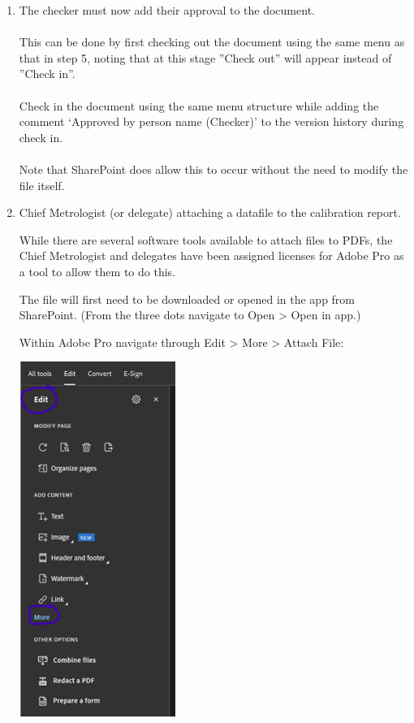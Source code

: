 \begin{enumerate}
\item The checker must now add their approval to the document.
\\
\\This can be done by first checking out the document using the same menu as that in step 5, noting that at this stage ''Check out'' will appear instead of ''Check in''.
\\
\\Check in the document using the same menu structure while adding the comment  ‘Approved by person name (Checker)’ to the version history during check in.
\\
\\Note that SharePoint does allow this to occur without the need to modify the file itself.

\item Chief Metrologist (or delegate) attaching a datafile to the calibration report.

While there are several software tools available to attach files to PDFs, the Chief Metrologist and delegates have been assigned licenses for Adobe Pro as a tool to allow them to do this.

The file will first need to be downloaded or opened in the app from SharePoint.  (From the three dots navigate to Open > Open in app.)

Within Adobe Pro navigate through Edit > More > Attach File:

\begin{center}
\includegraphics[scale=.55]{pictures/Step8_pic1}
\end{center}


\end{enumerate}
